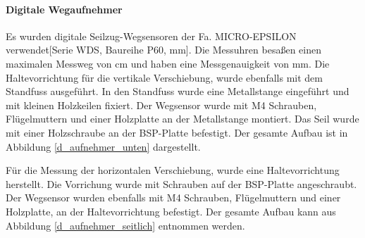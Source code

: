 \paragraph{Digitale Wegaufnehmer}

Es wurden digitale Seilzug-Wegsensoren der Fa. MICRO-EPSILON verwendet[Serie WDS, Baureihe P60, \unit[1000]{mm}]. Die Messuhren besaßen einen maximalen Messweg von \unit[100]{cm} und haben eine Messgenauigkeit von \unit[0,24]{mm}. Die Haltevorrichtung für die vertikale Verschiebung, wurde ebenfalls mit dem Standfuss ausgeführt. In den Standfuss wurde eine Metallstange eingeführt und mit kleinen Holzkeilen fixiert. Der  Wegsensor wurde mit M4 Schrauben, Flügelmuttern und einer Holzplatte an der Metallstange montiert. Das Seil wurde mit einer Holzschraube an der BSP-Platte befestigt. Der gesamte Aufbau ist in Abbildung \ref{d_aufnehmer_unten} dargestellt.

Für die Messung der horizontalen Verschiebung, wurde eine Haltevorrichtung herstellt. Die Vorrichung wurde mit Schrauben auf der BSP-Platte angeschraubt. Der Wegsensor wurden ebenfalls mit M4 Schrauben, Flügelmuttern und einer Holzplatte, an der Haltevorrichtung befestigt. Der gesamte Aufbau kann aus  Abbildung \ref{d_aufnehmer_seitlich} entnommen werden.



